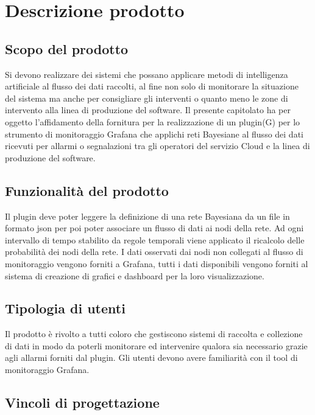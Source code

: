 \section{Descrizione prodotto}
		\subsection{Scopo del prodotto}			
Si devono realizzare dei sistemi che possano applicare metodi di intelligenza artificiale al flusso dei dati raccolti, al fine non solo di monitorare la situazione del sistema ma anche per consigliare gli interventi o quanto meno le zone di intervento alla linea di produzione del software.
Il presente capitolato ha per oggetto l'affidamento della fornitura per la
realizzazione di un plugin(G) per lo strumento di monitoraggio Grafana che
applichi reti Bayesiane al flusso dei dati ricevuti per allarmi o segnalazioni tra gli operatori del servizio Cloud e la linea di produzione del software.


		\subsection{Funzionalità del prodotto}
Il plugin deve poter leggere la definizione di una rete Bayesiana da un file in formato json per poi poter associare un flusso di dati ai nodi della rete. Ad ogni intervallo di tempo stabilito da regole temporali viene applicato il ricalcolo delle probabilità dei nodi della rete. I dati osservati dai nodi non collegati al flusso di monitoraggio vengono forniti a Grafana, tutti i dati disponibili vengono forniti al sistema di creazione di grafici e dashboard per la loro visualizzazione.


		\subsection{Tipologia di utenti}

Il prodotto è rivolto a tutti coloro che gestiscono sistemi di raccolta e
collezione di dati in modo da poterli monitorare ed intervenire qualora sia
necessario grazie agli allarmi forniti dal plugin.
Gli utenti devono avere familiarità  con il tool di monitoraggio Grafana.


		\subsection{Vincoli di progettazione}
